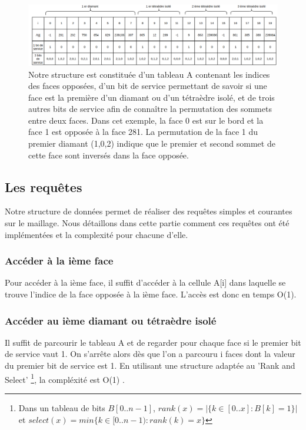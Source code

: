 \begin{figure}[H]
\begin{center}
\includegraphics[scale=0.35]{Images/structure}
\caption{Notre structure est constituée d'un tableau A contenant les indices des faces opposées, d'un bit de service permettant de savoir si une face est la première d'un diamant ou d'un tétraèdre isolé, et de trois autres bits de service afin de connaître la permutation des sommets entre deux faces. Dans cet exemple, la face 0 est sur le bord et la face 1 est opposée à la face 281. La permutation de la face 1 du premier diamant (1,0,2) indique que le premier et second sommet de cette face sont inversés dans la face opposée.}
\label{fig:structure}
\end{center}
\end{figure}
\subsection{Les requêtes}
\noindent
Notre structure de données permet de réaliser des requêtes simples et courantes sur le maillage. Nous détaillons dans cette partie comment ces requêtes ont été implémentées et la complexité pour chacune d'elle.
\subsubsection{Accéder à la ième face}
\noindent
Pour accéder à la ième face, il suffit d'accéder à la cellule A[i] dans laquelle se trouve l'indice de la face opposée à la ième face. L'accès est donc en temps O(1).
\subsubsection{Accéder au ième diamant ou tétraèdre isolé}
\noindent
Il suffit de parcourir le tableau A et de regarder pour chaque face si le premier bit de service vaut 1. On s'arrête alors dès que l'on a parcouru i faces dont la valeur du premier bit de service est 1. En utilisant une structure adaptée au 'Rank and Select' \footnote{Dans un tableau de bits $B[0..n-1]$, $rank(x) = |\{k\in [0..x] : B[k]=1\}|$ et $select(x)=min\{k\in [0..n-1) : rank(k)=x\}$}, la compléxité est O(1) \cite{rank_and_select}.
